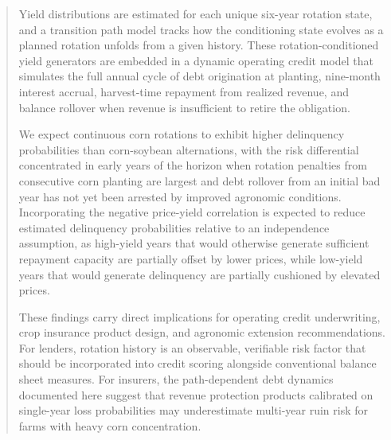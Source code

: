 \documentclass[12pt]{article}
\begin{document}
\begin{abstract}
Yield distributions are estimated for each unique six-year rotation state, and a transition path model tracks how the conditioning state evolves as a planned rotation unfolds from a given history. These rotation-conditioned yield generators are embedded in a dynamic operating credit model that simulates the full annual cycle of debt origination at planting, nine-month interest accrual, harvest-time repayment from realized revenue, and balance rollover when revenue is insufficient to retire the obligation. %


We expect continuous corn rotations to exhibit higher delinquency probabilities than corn-soybean alternations, with the risk differential concentrated in early years of the horizon when rotation penalties from consecutive corn planting are largest and debt rollover from an initial bad year has not yet been arrested by improved agronomic conditions. Incorporating the negative price-yield correlation is expected to reduce estimated delinquency probabilities relative to an independence assumption, as high-yield years that would otherwise generate sufficient repayment capacity are partially offset by lower prices, while low-yield years that would generate delinquency are partially cushioned by elevated prices. 

These findings carry direct implications for operating credit underwriting, crop insurance product design, and agronomic extension recommendations. For lenders, rotation history is an observable, verifiable risk factor that should be incorporated into credit scoring alongside conventional balance sheet measures. For insurers, the path-dependent debt dynamics documented here suggest that revenue protection products calibrated on single-year loss probabilities may underestimate multi-year ruin risk for farms with heavy corn concentration. 

\end{abstract}
\end{document}
